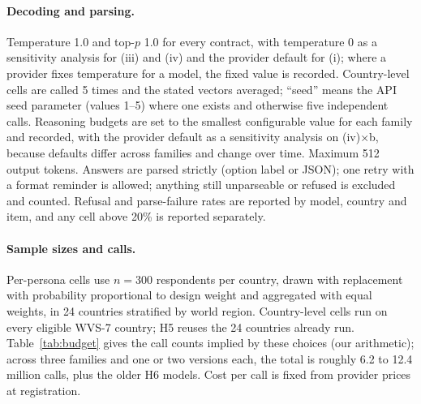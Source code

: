 \documentclass[11pt]{article}
\begin{document}
\paragraph{Decoding and parsing.} Temperature 1.0 and top-$p$ 1.0 for every contract, with temperature 0 as a sensitivity analysis for (iii) and (iv) and the provider default for (i); where a provider fixes temperature for a model, the fixed value is recorded. Country-level cells are called 5 times and the stated vectors averaged; ``seed'' means the API seed parameter (values 1--5) where one exists and otherwise five independent calls. Reasoning budgets are set to the smallest configurable value for each family and recorded, with the provider default as a sensitivity analysis on (iv)$\times$b, because defaults differ across families and change over time. Maximum 512 output tokens. Answers are parsed strictly (option label or JSON); one retry with a format reminder is allowed; anything still unparseable or refused is excluded and counted. Refusal and parse-failure rates are reported by model, country and item, and any cell above 20\% is reported separately.

\paragraph{Sample sizes and calls.} Per-persona cells use $n = 300$ respondents per country, drawn with replacement with probability proportional to design weight and aggregated with equal weights, in 24 countries stratified by world region. Country-level cells run on every eligible WVS-7 country; H5 reuses the 24 countries already run. Table~\ref{tab:budget} gives the call counts implied by these choices (our arithmetic); across three families and one or two versions each, the total is roughly 6.2 to 12.4 million calls, plus the older H6 models. Cost per call is fixed from provider prices at registration.
\end{document}
